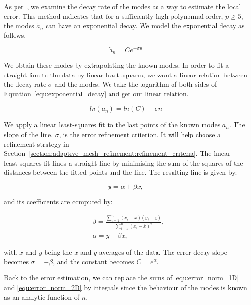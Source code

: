 As per~\cite{Mavriplis1990}, we examine the decay rate of the modes as a way to estimate the local
error. This method indicates that for a sufficiently high polynomial order, $p \geq 5$, the modes
$\widetilde{a}_n$ can have an exponential decay. We model the exponential decay as follows.

\begin{equation} \label{equ:exponential_decay}
	\widetilde{a}_n = Ce^{-\sigma n}
\end{equation}

We obtain these modes by extrapolating the known modes. In order to fit a straight line to the data
by linear least-squares, we want a linear relation between the decay rate $\sigma$ and the modes. We
take the logarithm of both sides of Equation~\ref{equ:exponential_decay} and get our linear
relation.

\begin{equation} \label{equ:exponential_decay_linear}
	ln(\widetilde{a}_n) = ln(C) - \sigma n
\end{equation}

We apply a linear least-squares fit to the last points of the known modes $a_n$. The slope of the
line, $\sigma$, is the error refinement criterion. It will help choose a refinement strategy in
Section~\ref{section:adaptive_mesh_refinement:refinement_criteria}. The linear least-squares fit
finds a straight line by minimising the sum of the squares of the distances between the fitted
points and the line. The resulting line is given by:

\begin{equation}
	y = \alpha + \beta x,
\end{equation}

\noindent
and its coefficients are computed by:

\begin{align}
	& \beta = \frac{\sum_{i = 1}^{n}(x_i - \overline{x})(y_i - \overline{y})}{\sum_{i = 1}^{n}(x_i -\overline{x})^2}, \\
	& \alpha = \overline{y} - \beta \overline{x},
\end{align}

\noindent
with $\overline{x}$ and $\overline{y}$ being the $x$ and $y$ averages of the data. The error
decay slope becomes $\sigma = - \beta$, and the constant becomes $C = e^\alpha$.

Back to the error estimation, we can replace the sums of \ref{equ:error_norm_1D} and
\ref{equ:error_norm_2D} by integrals since the behaviour of the modes is known as an analytic
function of $n$.

